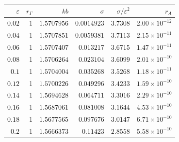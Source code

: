 \begin{tabular}{rrrrrr}
\toprule
$\varepsilon$ & $r_\Gamma$ & $kb$ & $\sigma$ & $\sigma/\varepsilon^2$ & $r_A$ \\
\midrule
$0.02$ & 1 & $1.5707956$ & $0.0014923$ & $3.7308$ & $2.00\times10^{-12}$ \\
$0.04$ & 1 & $1.5707851$ & $0.0059381$ & $3.7113$ & $2.15\times10^{-11}$ \\
$0.06$ & 1 & $1.5707407$ & $0.013217$ & $3.6715$ & $1.47\times10^{-11}$ \\
$0.08$ & 1 & $1.5706264$ & $0.023104$ & $3.6099$ & $2.01\times10^{-10}$ \\
$0.1$ & 1 & $1.5704004$ & $0.035268$ & $3.5268$ & $1.18\times10^{-11}$ \\
$0.12$ & 1 & $1.5700226$ & $0.049296$ & $3.4233$ & $1.59\times10^{-10}$ \\
$0.14$ & 1 & $1.5694628$ & $0.064711$ & $3.3016$ & $2.29\times10^{-10}$ \\
$0.16$ & 1 & $1.5687061$ & $0.081008$ & $3.1644$ & $4.53\times10^{-10}$ \\
$0.18$ & 1 & $1.5677565$ & $0.097676$ & $3.0147$ & $6.71\times10^{-10}$ \\
$0.2$ & 1 & $1.5666373$ & $0.11423$ & $2.8558$ & $5.58\times10^{-10}$ \\
\bottomrule
\end{tabular}
